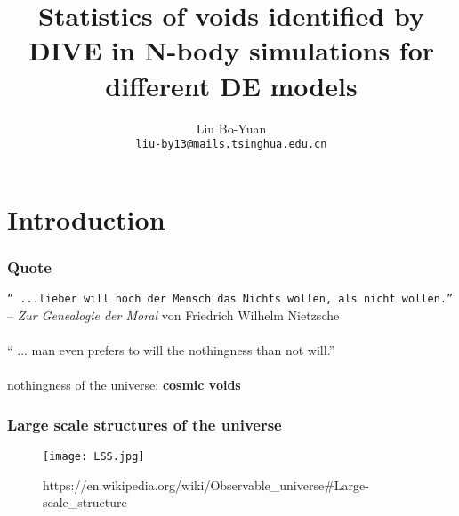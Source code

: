 \documentclass{beamer}
\title{Statistics of voids identified by \textsc{DIVE} in N-body simulations for different DE models}
\author{Liu Bo-Yuan\\ %
	      \texttt{liu-by13@mails.tsinghua.edu.cn}} %
\institute{Department of Physics, Tsinghua University, Beijing, China(PRC)} %
\newtheorem{Narrow down the analysis}{Narrow down the analysis}
\begin{document}
\begin{frame}

  \titlepage %
  
\end{frame}


\begin{frame}
\tableofcontents %
\end{frame}

\section{Introduction} %
\begin{frame}
	\frametitle{Quote}
	\centering
	\texttt{``
	...lieber will noch der Mensch das Nichts wollen, als nicht wollen.'' }\\
	-- \textit{Zur Genealogie der Moral} von Friedrich Wilhelm Nietzsche\\
	\ \\
	\pause ``
	... man even prefers to will the nothingness than not will.''\\
	 \ \\
	\pause nothingness of the universe: \pause \textbf{cosmic voids}
\end{frame}

\begin{frame}
	\frametitle{Large scale structures of the universe}
	\begin{figure}
	\centering
	\texttt{[image: LSS.jpg]}
	\caption{https://en.wikipedia.org/wiki/Observable\_universe\#Large-scale\_structure}
	\end{figure}
\end{frame}
\end{document}
